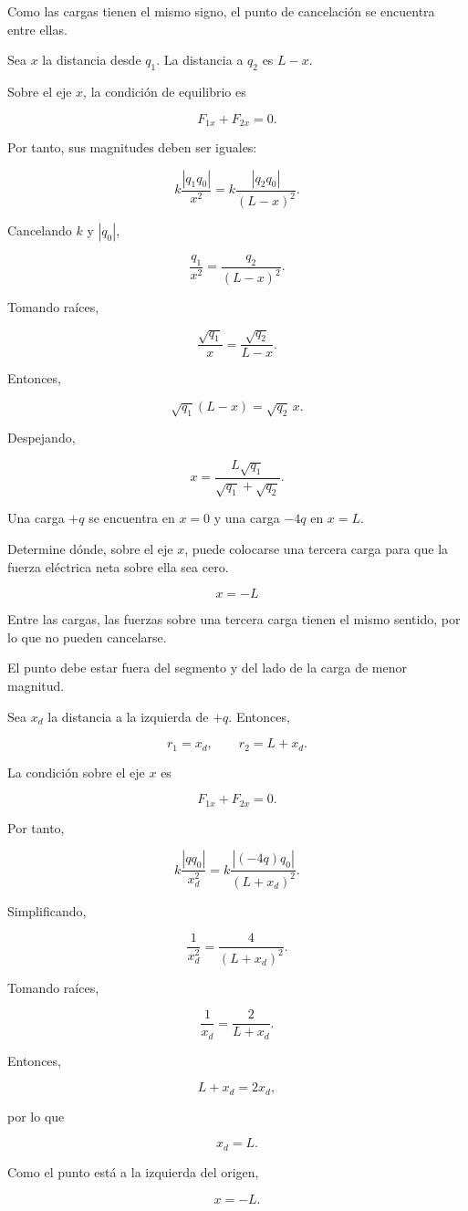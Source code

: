 \begin{explicacion}
Como las cargas tienen el mismo signo, el punto de cancelación se encuentra
entre ellas.

Sea \(x\) la distancia desde \(q_1\). La distancia a \(q_2\) es \(L-x\).

Sobre el eje \(x\), la condición de equilibrio es

\[
F_{1x}+F_{2x}=0.
\]

Por tanto, sus magnitudes deben ser iguales:

\[
k\frac{|q_1q_0|}{x^2}
=
k\frac{|q_2q_0|}{(L-x)^2}.
\]

Cancelando \(k\) y \(|q_0|\),

\[
\frac{q_1}{x^2}=\frac{q_2}{(L-x)^2}.
\]

Tomando raíces,

\[
\frac{\sqrt{q_1}}{x}
=
\frac{\sqrt{q_2}}{L-x}.
\]

Entonces,

\[
\sqrt{q_1}(L-x)=\sqrt{q_2}\,x.
\]

Despejando,

\[
\boxed{x=\frac{L\sqrt{q_1}}{\sqrt{q_1}+\sqrt{q_2}}}.
\]
\end{explicacion}


\begin{ejercicio}
Una carga \(+q\) se encuentra en \(x=0\) y una carga \(-4q\) en \(x=L\).

Determine dónde, sobre el eje \(x\), puede colocarse una tercera carga para
que la fuerza eléctrica neta sobre ella sea cero.
\end{ejercicio}

\begin{respuesta}
\[
\boxed{x=-L}
\]
\end{respuesta}

\begin{explicacion}
Entre las cargas, las fuerzas sobre una tercera carga tienen el mismo
sentido, por lo que no pueden cancelarse.

El punto debe estar fuera del segmento y del lado de la carga de menor
magnitud.

Sea \(x_d\) la distancia a la izquierda de \(+q\). Entonces,

\[
r_1=x_d, \qquad r_2=L+x_d.
\]

La condición sobre el eje \(x\) es

\[
F_{1x}+F_{2x}=0.
\]

Por tanto,

\[
k\frac{|qq_0|}{x_d^2}
=
k\frac{|(-4q)q_0|}{(L+x_d)^2}.
\]

Simplificando,

\[
\frac{1}{x_d^2}
=
\frac{4}{(L+x_d)^2}.
\]

Tomando raíces,

\[
\frac{1}{x_d}=\frac{2}{L+x_d}.
\]

Entonces,

\[
L+x_d=2x_d,
\]

por lo que

\[
x_d=L.
\]

Como el punto está a la izquierda del origen,

\[
\boxed{x=-L}.
\]
\end{explicacion}


